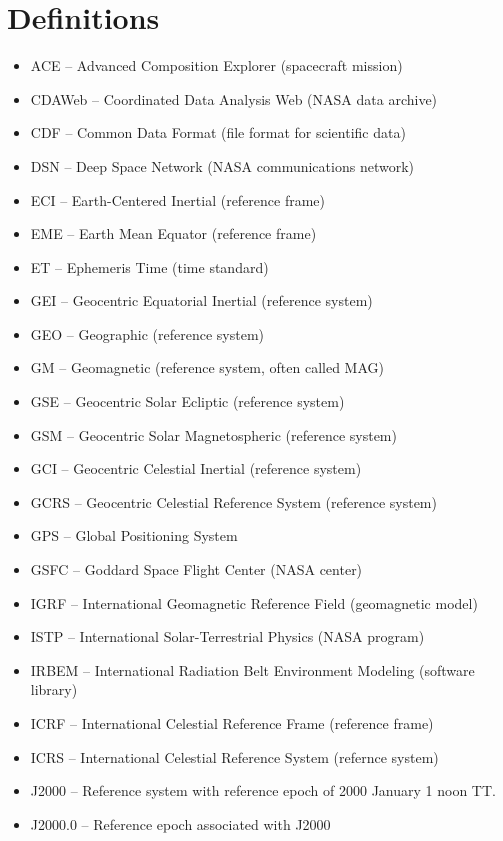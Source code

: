\documentclass[draft]{agujournal2019}
\begin{document}
\section{Definitions}
\label{sect:glossary}

\begin{itemize}
\item ACE -- Advanced Composition Explorer (spacecraft mission)
\item CDAWeb -- Coordinated Data Analysis Web (NASA data archive)
\item CDF -- Common Data Format (file format for scientific data)
\item DSN -- Deep Space Network (NASA communications network)
\item ECI -- Earth-Centered Inertial (reference frame)
\item EME -- Earth Mean Equator (reference frame)
\item ET -- Ephemeris Time (time standard)
\item GEI -- Geocentric Equatorial Inertial (reference system)
\item GEO -- Geographic (reference system)
\item GM -- Geomagnetic (reference system, often called MAG)
\item GSE -- Geocentric Solar Ecliptic (reference system)
\item GSM -- Geocentric Solar Magnetospheric (reference system)
\item GCI -- Geocentric Celestial Inertial (reference system)
\item GCRS -- Geocentric Celestial Reference System (reference system)
\item GPS -- Global Positioning System
\item GSFC -- Goddard Space Flight Center (NASA center)
\item IGRF -- International Geomagnetic Reference Field (geomagnetic model)
\item ISTP -- International Solar-Terrestrial Physics (NASA program)
\item IRBEM -- International Radiation Belt Environment Modeling (software library)
\item ICRF -- International Celestial Reference Frame (reference frame)
\item ICRS -- International Celestial Reference System (refernce system)
\item J2000 -- Reference system with reference epoch of 2000 January 1 noon TT.
\item J2000.0 -- Reference epoch associated with J2000

\end{itemize}
\end{document}
